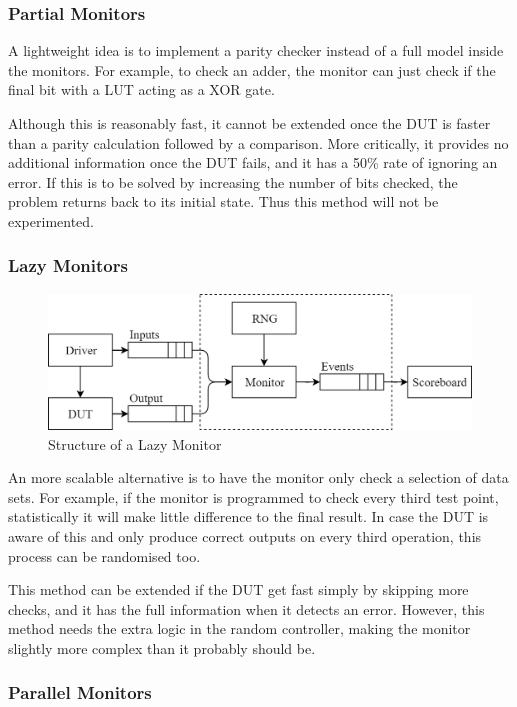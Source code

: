 \subsubsection{Partial Monitors}
A lightweight idea is to implement a parity checker instead of a full model
inside the monitors.
For example, to check an adder, the monitor can just check if the final bit
with a LUT acting as a XOR gate.

Although this is reasonably fast, it cannot be extended once the DUT is faster
than a parity calculation followed by a comparison.
More critically, it provides no additional information once the DUT fails, and
it has a 50\% rate of ignoring an error.
If this is to be solved by increasing the number of bits checked, the problem
returns back to its initial state.
Thus this method will not be experimented.

\subsubsection{Lazy Monitors}

\begin{figure}[H]
  \centering
  \includegraphics[width=12cm]{img/LazMon}
  \caption{Structure of a Lazy Monitor}
  \label{LazMon}
\end{figure}

An more scalable alternative is to have the monitor only check a selection of
data sets.
For example, if the monitor is programmed to check every third test point,
statistically it will make little difference to the final result.
In case the DUT is aware of this and only produce correct outputs on every third
operation, this process can be randomised too.

This method can be extended if the DUT get fast simply by skipping more checks,
and it has the full information when it detects an error.
However, this method needs the extra logic in the random controller, making the
monitor slightly more complex than it probably should be.

\subsubsection{Parallel Monitors}


